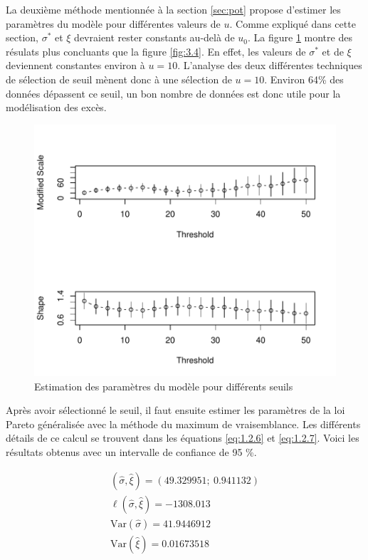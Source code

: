 La deuxième méthode mentionnée à la section \ref{sec:pot} propose d'estimer les paramètres du modèle pour différentes valeurs de $u$. Comme expliqué dans cette section, $\sigma^*$ et $\xi$ devraient rester constants au-delà de $u_0$. La figure \ref{fig:3.5} montre des résulats plus concluants que la figure \ref{fig:3.4}. En effet, les valeurs de $\sigma^*$ et de $\xi$ deviennent constantes environ à $u=10$. L'analyse des deux différentes techniques de sélection de seuil mènent donc à une sélection de $u=10$. Environ 64\% des données dépassent ce seuil, un bon nombre de données est donc utile pour la modélisation des excès.
\begin{figure}[h]
\begin{center}
\includegraphics{images/fig-010}
\end{center}
\caption{Estimation des paramètres du modèle pour différents seuils}
\label{fig:3.5}
\end{figure}

Après avoir sélectionné le seuil, il faut ensuite estimer les paramètres de la loi Pareto généralisée avec la méthode du maximum de vraisemblance. Les différents détails de ce calcul se trouvent dans les équations \ref{eq:1.2.6} et \ref{eq:1.2.7}. Voici les résultats obtenus avec un intervalle de confiance de 95 \%.

\begin{equation*}
\begin{gathered}
(\hat\sigma,\hat\xi) = (49.329951;\ 0.941132)\\
\ell(\hat\sigma,\hat\xi) = -1308.013\\
\text{Var}(\hat\sigma) = 41.9446912\\
\text{Var}(\hat\xi) = 0.01673518
\end{gathered}
\end{equation*}
\

